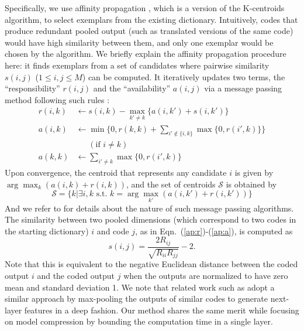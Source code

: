 Specifically, we use affinity propagation \cite{frey2007clustering}, which is a version of the K-centroids algorithm, to select exemplars from the existing dictionary. Intuitively, codes that produce redundant pooled output (such as translated versions of the same code) would have high similarity between them, and only one exemplar would be chosen by the algorithm. We briefly explain the affinity propagation procedure here: it finds exemplars from a set of candidates where pairwise similarity $s(i,j)$ ($1 \leq i, j \leq M$) can be computed. It iteratively updates two terms, the ``responsibility'' $r(i,j)$ and the ``availability'' $a(i,j)$ via a message passing method following such rules \cite{frey2007clustering}:
\begin{align}
    r(i,k) & \leftarrow s(i,k) - \max_{k'\neq k}\{a(i,k') + s(i,k')\}\label{ap:r}\\
    a(i,k) & \leftarrow \min\{0, r(k,k) + \sum\nolimits_{i'\notin\{i,k\}}\max\{0, r(i',k)\}\}\nonumber\\
           & \phantom{\leftarrow } (\text{if } i \neq k)\\
    a(k,k) & \leftarrow \sum\nolimits_{i'\neq k} \max\{0, r(i', k)\}\label{ap:a}
\end{align}
Upon convergence, the centroid that represents any candidate $i$ is given by $\arg\max_{k} (a(i,k) + r(i,k))$, and the set of centroids $\mathcal{S}$ is obtained by
\begin{equation}
    \mathcal{S} = \{k | \exists i,k \text{ s.t. } k = \arg\max_{k'} (a(i,k') + r(i,k'))\}
\end{equation}
And we refer to \cite{frey2007clustering} for details about the nature of such message passing algorithms. The similarity between two pooled dimensions (which correspond to two codes in the starting dictionary) $i$ and code $j$, as in Eqn.\ (\ref{ap:r})-(\ref{ap:a}), is computed as
\begin{equation}
    s(i,j) = \frac{2R_{ij}}{\sqrt{R_{ii}R_{jj}}} - 2.
\end{equation}
Note that this is equivalent to the negative Euclidean distance between the coded output $i$ and the coded output $j$ when the outputs are normalized to have zero mean and standard deviation 1. We note that related work such as \cite{coates2012emergence} adopt a similar approach by max-pooling the outputs of similar codes to generate next-layer features in a deep fashion. Our method shares the same merit while focusing on model compression by bounding the computation time in a single layer.

